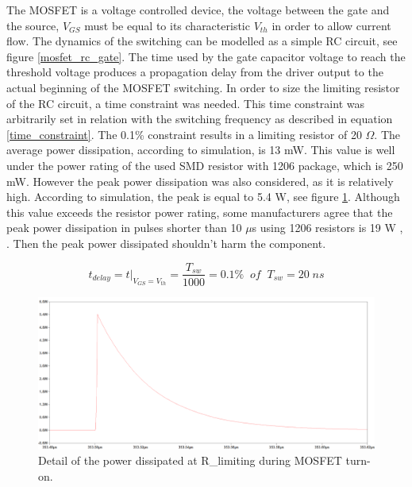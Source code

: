 The MOSFET is a voltage controlled device, the voltage between the gate and the source, $V_{GS}$ must be equal to its characteristic $V_{th}$ in order to allow current flow. The dynamics of the switching can be modelled as a simple RC circuit, see figure \ref{mosfet_rc_gate}. The time used by the gate capacitor voltage to reach the threshold voltage produces a propagation delay from the driver output to the actual beginning of the MOSFET switching. In order to size the limiting resistor of the RC circuit, a time constraint was needed. This time constraint was arbitrarily set in relation with the switching frequency as described in equation \ref{time_constraint}. The 0.1\% constraint results in a limiting resistor of 20 $\Omega$. The average power dissipation, according to simulation, is 13 mW. This value is well under the power rating of the used SMD resistor with 1206 package, which is 250 mW. However the peak power dissipation was also considered, as it is relatively high. According to simulation, the peak is equal to 5.4 W, see figure \ref{gate_resistor_power_dissipation}. Although this value exceeds the resistor power rating, some manufacturers agree that the peak power dissipation in pulses shorter than 10 $\mu$s using 1206 resistors is 19 W \cite{pulse_withstanding_chip_resistors}, \cite{gate_driver_design_infineon}. Then the peak power dissipated shouldn't harm the component.

\begin{equation} \label{time_constraint}
t_{delay} = t\big\rvert_{V_{GS} = V_{th}} =\frac{T_{sw}}{1000} = 0.1 \% \;\; of \;\; T_{sw} = 20 \; ns
\end{equation}


\begin{figure}[htbp]
	\begin{center}
		\includegraphics[width=1.15\textwidth]{../Pictures/P1/Component_sizing/Gate_resistor_power_dissipation.png}
		\caption{Detail of the power dissipated at R\_limiting during MOSFET turn-on.}
		\label{gate_resistor_power_dissipation}
	\end{center}	
\end{figure}
 
